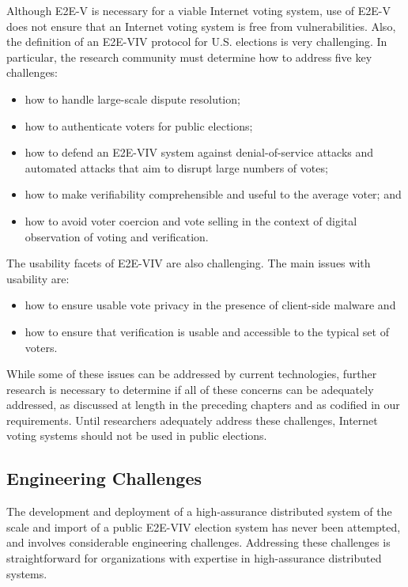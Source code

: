 Although E2E-V is necessary for a viable Internet voting system, use
of E2E-V does not ensure that an Internet voting system is free from
vulnerabilities. Also, the definition of an E2E-VIV protocol for
U.S. elections is very challenging. In particular, the research
community must determine how to address five key challenges:

\begin{itemize}
\item how to handle large-scale dispute resolution;
\item how to authenticate voters for public elections;
\item how to defend an E2E-VIV system against denial-of-service
  attacks and automated attacks that aim to disrupt large numbers of
  votes;
\item how to make verifiability comprehensible and useful to the
  average voter; and
\item how to avoid voter coercion and vote selling in the context of
  digital observation of voting and verification.
\end{itemize}

The usability facets of E2E-VIV are also challenging. The main issues
with usability are:

\begin{itemize}
\item how to ensure usable vote privacy in the presence of client-side
  malware and
\item how to ensure that verification is usable and
  accessible to the typical set of voters.
\end{itemize}

While some of these issues can be addressed by current technologies,
further research is necessary to determine if all of these concerns
can be adequately addressed, as discussed at length in the preceding
chapters and as codified in our requirements. Until researchers
adequately address these challenges, Internet voting systems should
not be used in public elections.

\subsection{Engineering Challenges}

The development and deployment of a high-assurance distributed system
of the scale and import of a public E2E-VIV election system has never
been attempted, and involves considerable engineering
challenges. Addressing these challenges is straightforward for
organizations with expertise in high-assurance distributed systems.

